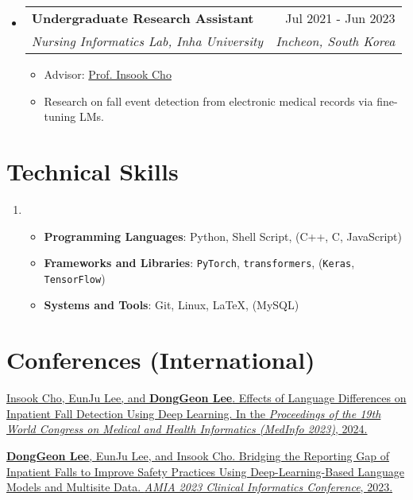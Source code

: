 \documentclass[letterpaper,11pt]{article}
\makeatletter
\newcommand{\resumeSubheading}[4]{
  \vspace{-1pt}\item
    \begin{tabular*}{0.97\textwidth}{l@{\extracolsep{\fill}}r}
      #1 & #2 \\
      \textit{\small#3} & \textit{\small #4} \\
    \end{tabular*}\vspace{-5pt}
}
\makeatother
\begin{document}
\begin{itemize}[leftmargin=*,label=]
        \resumeSubheading
        {\textbf{Undergraduate Research Assistant}}{Jul 2021 - Jun 2023}
            {Nursing Informatics Lab, Inha University}{Incheon, South Korea}
            \begin{itemize}[label=\bullet]
                \item{Advisor: \href{http://bit.ly/412nYOw}{Prof. Insook Cho}}
                \item{Research on fall event detection from electronic medical records via fine-tuning LMs.}
            \end{itemize}
            
            
    \end{itemize}

    \section{Technical Skills}
    \begin{enumerate}[noitemsep, leftmargin=*,label=]
        \item{
            \begin{itemize}[label=\bullet]
                \item{\textbf{Programming Languages}: Python, Shell Script, (C++, C, JavaScript)}
                \item{\textbf{Frameworks and Libraries}: \texttt{PyTorch}, \texttt{transformers}, (\texttt{Keras}, \texttt{TensorFlow})}
                \item{\textbf{Systems and Tools}: Git, Linux, \LaTeX, (MySQL)}
            \end{itemize}
        }
    \end{enumerate}

    \section{Conferences (International)}
    \begin{enumerate}[noitemsep, leftmargin=*,label={[\arabic*]}]
        \item \href{https://pubmed.ncbi.nlm.nih.gov/38426881/}{Insook Cho, EunJu Lee, and \textbf{DongGeon Lee}. Effects of Language Differences on Inpatient Fall Detection Using Deep Learning. In the \textit{Proceedings of the 19th World Congress on Medical and Health Informatics (MedInfo 2023)}, 2024.}
        
        \item \href{https://bit.ly/cic23s47}{\textbf{DongGeon Lee}, EunJu Lee, and Insook Cho. Bridging the Reporting Gap of Inpatient Falls to Improve Safety Practices Using Deep-Learning-Based Language Models and Multisite Data. \textit{AMIA 2023 Clinical Informatics Conference}, 2023.}
    \end{enumerate}
        
\end{document}
